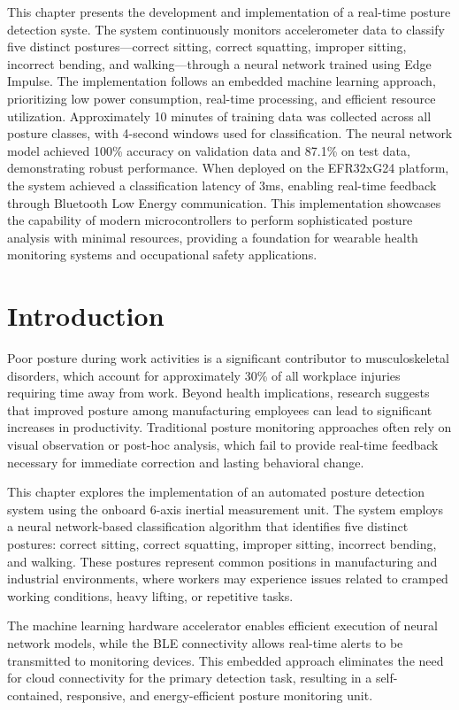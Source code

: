 \documentclass[
  9pt,
  letterpaper,
  abstract,
  titlepage]{scrbook}
\begin{document}
This chapter presents the development and implementation of a real-time
posture detection syste. The system continuously monitors accelerometer
data to classify five distinct postures---correct sitting, correct
squatting, improper sitting, incorrect bending, and walking---through a
neural network trained using Edge Impulse. The implementation follows an
embedded machine learning approach, prioritizing low power consumption,
real-time processing, and efficient resource utilization. Approximately
10 minutes of training data was collected across all posture classes,
with 4-second windows used for classification. The neural network model
achieved 100\% accuracy on validation data and 87.1\% on test data,
demonstrating robust performance. When deployed on the EFR32xG24
platform, the system achieved a classification latency of 3ms, enabling
real-time feedback through Bluetooth Low Energy communication. This
implementation showcases the capability of modern microcontrollers to
perform sophisticated posture analysis with minimal resources, providing
a foundation for wearable health monitoring systems and occupational
safety applications.

\section{Introduction}\label{introduction-2}

Poor posture during work activities is a significant contributor to
musculoskeletal disorders, which account for approximately 30\% of all
workplace injuries requiring time away from work. Beyond health
implications, research suggests that improved posture among
manufacturing employees can lead to significant increases in
productivity. Traditional posture monitoring approaches often rely on
visual observation or post-hoc analysis, which fail to provide real-time
feedback necessary for immediate correction and lasting behavioral
change.

This chapter explores the implementation of an automated posture
detection system using the onboard 6-axis inertial measurement unit. The
system employs a neural network-based classification algorithm that
identifies five distinct postures: correct sitting, correct squatting,
improper sitting, incorrect bending, and walking. These postures
represent common positions in manufacturing and industrial environments,
where workers may experience issues related to cramped working
conditions, heavy lifting, or repetitive tasks.

The machine learning hardware accelerator enables efficient execution of
neural network models, while the BLE connectivity allows real-time
alerts to be transmitted to monitoring devices. This embedded approach
eliminates the need for cloud connectivity for the primary detection
task, resulting in a self-contained, responsive, and energy-efficient
posture monitoring unit.
\end{document}
